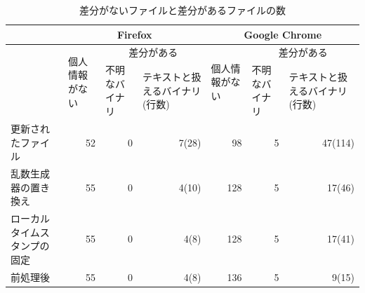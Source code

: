 \documentclass[submit]{ipsj}
\begin{document}
\begin{table}[ht]
\caption{差分がないファイルと差分があるファイルの数}
\centering
\begin{tabular}{|p{2cm}|l|p{1.9cm}|p{1.9cm}|l|p{1.9cm}|p{1.9cm}|}
\hline
&\multicolumn{3}{|c|}{\footnotesize{Firefox}}&\multicolumn{3}{c|}{\footnotesize{Google Chrome}}\\
\hline
&\multirow{2}{1.5cm}{\footnotesize{個人情報がない}} &
\multicolumn{2}{c|}{\footnotesize{差分がある}} &\multirow{2}{1.5cm}{\footnotesize{個人情報がない}}&
\multicolumn{2}{c|}{\footnotesize{差分がある}} \\
\cline{3-4}\cline{6-7}
  & & \footnotesize{不明なバイナリ} & \footnotesize{テキストと扱えるバイナリ(行数)}& &\footnotesize{不明なバイナリ} & \footnotesize{テキストと扱えるバイナリ(行数)} \\
\hline
\footnotesize{更新されたファイル}&\multicolumn{1}{r|}{\footnotesize{52}}&\multicolumn{1}{r|}{\footnotesize{0}}&\multicolumn{1}{r|}{\footnotesize{7(28)}}  & \multicolumn{1}{r|}{\footnotesize{98}} & \multicolumn{1}{r|}{\footnotesize{5}} & \multicolumn{1}{r|}{\footnotesize{47(114)}} \\
\hline
\footnotesize{乱数生成器の置き換え}&\multicolumn{1}{r|}{\footnotesize{55}}&\multicolumn{1}{r|}{\footnotesize{0}}&\multicolumn{1}{r|}{\footnotesize{4(10)} }& \multicolumn{1}{r|}{\footnotesize{128} }& \multicolumn{1}{r|}{\footnotesize{5} }& \multicolumn{1}{r|}{\footnotesize{17(46)}} \\
\hline
\footnotesize{ローカルタイムスタンプの固定}&\multicolumn{1}{r|}{\footnotesize{55}}&\multicolumn{1}{r|}{\footnotesize{0}}&\multicolumn{1}{r|}{\footnotesize{4(8)} }&  \multicolumn{1}{r|}{\footnotesize{128} }& \multicolumn{1}{r|}{\footnotesize{5} }&\multicolumn{1}{r|}{\footnotesize{17(41) }}\\
\hline
\footnotesize{前処理後}&\multicolumn{1}{r|}{\footnotesize{55}}&\multicolumn{1}{r|}{\footnotesize{0}}&\multicolumn{1}{r|}{\footnotesize{4(8)}} &\multicolumn{1}{r|}{ \footnotesize{136} }& \multicolumn{1}{r|}{\footnotesize{5} }&\multicolumn{1}{r|}{\footnotesize{9(15)}}\\
\hline
\end{tabular}
\label{fig:result}
\end{table}
\end{document}
